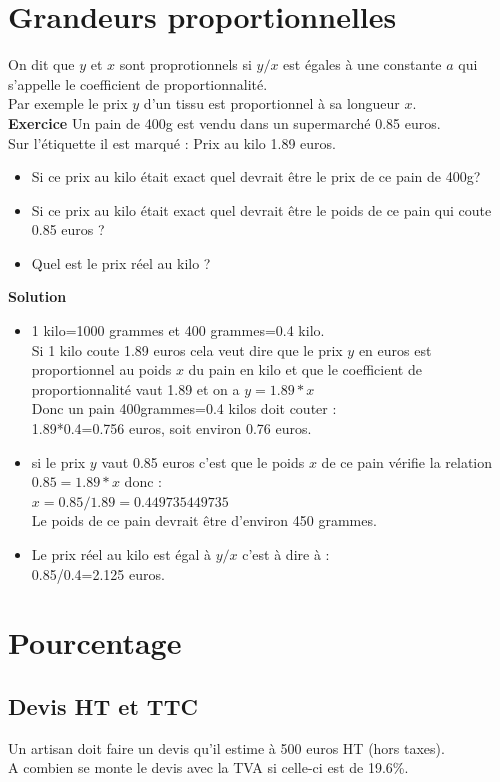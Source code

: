 \documentclass[a4paper,11pt]{book}
\begin{document}
\section{Grandeurs proportionnelles}
On dit que $y$ et $x$ sont proprotionnels si $y/x$ est \'egales \`a une 
constante $a$ qui s'appelle le coefficient de proportionnalit\'e.\\
Par exemple le prix $y$ d'un tissu est proportionnel \`a sa 
longueur $x$.\\
{\bf Exercice}
Un pain de 400g est vendu dans un supermarch\'e 0.85 euros.\\
Sur l'\'etiquette il est marqu\'e :
Prix au kilo 1.89 euros.\\
\begin{itemize}
\item
Si ce prix au kilo \'etait exact quel devrait \^etre le prix de ce pain 
de 400g?\\
\item
Si ce prix au kilo \'etait exact quel devrait \^etre le poids de ce pain 
qui coute 0.85 euros ?\\
\item Quel est le prix r\'eel au kilo ?
\end{itemize}
{\bf Solution}
\begin{itemize}
\item 1 kilo=1000 grammes et 400 grammes=0.4 kilo.\\
Si 1 kilo coute 1.89 euros cela veut dire que le prix $y$ en euros est 
proportionnel au poids $x$ du pain en kilo et que le coefficient de
 proportionnalit\'e vaut 1.89 et on a $y=1.89*x$\\
Donc un pain 400grammes=0.4 kilos doit couter :\\
1.89*0.4=0.756 euros, soit environ 0.76 euros.
\item si le prix $y$ vaut 0.85 euros c'est que le poids $x$ de ce pain 
v\'erifie la relation $0.85=1.89*x$ donc :\\
$x=0.85/1.89=0.449735449735$\\
Le poids de ce pain devrait \^etre d'environ 450 grammes.
\item Le prix r\'eel au kilo est \'egal \`a $y/x$ c'est \`a dire \`a :\\
0.85/0.4=2.125 euros.
\end{itemize}
\section{Pourcentage}
\subsection{Devis HT et TTC}
Un artisan doit faire un devis qu'il estime \`a 500 euros HT (hors taxes).\\
A combien se monte le devis avec la TVA si celle-ci est de 19.6\%.
\end{document}
